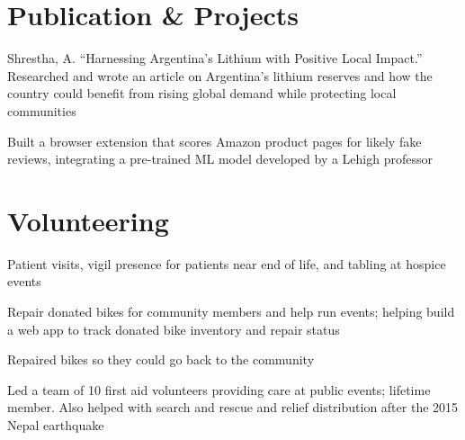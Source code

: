 \documentclass[]{deedy-resume-openfont}
\begin{document}
\hfill
%
%
\begin{minipage}[t]{0.66\textwidth}


\section{Publication \& Projects}

Shrestha, A. ``Harnessing Argentina's Lithium with Positive Local Impact.'' Researched and wrote an article on Argentina's lithium reserves and how the country could benefit from rising global demand while protecting local communities
\sectionsep

Built a browser extension that scores Amazon product pages for likely fake reviews, integrating a pre-trained ML model developed by a Lehigh professor
\sectionsep

\sectionsep

\section{Volunteering}

Patient visits, vigil presence for patients near end of life, and tabling at hospice events
\sectionsep

Repair donated bikes for community members and help run events; helping build a web app to track donated bike inventory and repair status
\sectionsep

Repaired bikes so they could go back to the community
\sectionsep

Led a team of 10 first aid volunteers providing care at public events; lifetime member. Also helped with search and rescue and relief distribution after the 2015 Nepal earthquake
\sectionsep


\end{minipage}
\end{document}
